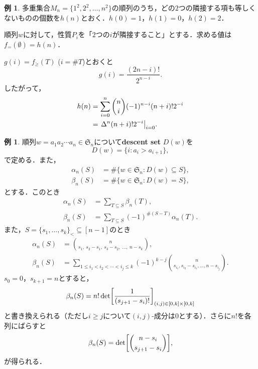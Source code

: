 \documentclass[xelatex,ja=standard,a4paper,14pt,everyparhook=compat]{bxjsarticle}
\newcommand{\fS}{\mathfrak{S}}
\theoremstyle{definition}
\newtheorem{example}[theorem]{例}
\begin{document}
\setcounter{theorem}{2}
\begin{example}
    多重集合$M_n = \{1^2, 2^2, \ldots, n^2\}$の順列のうち，どの$2$つの隣接する項も等しくないものの個数を$h(n)$とおく．$h(0) = 1$，$h(1) = 0$，$h(2) = 2$．

    順列$w$に対して，性質$P_i$を「$2$つの$i$が隣接すること」とする．求める値は$f_=(\emptyset) = h(n)$．

    $g(i) = f_\geq(T)$ ($i=\#T$)とおくと \begin{equation*}
        g(i) = \frac{(2n-i)!}{2^{n-i}}.
    \end{equation*}
    したがって， \begin{align*}
        h(n) &= \sum_{i=0}^n \binom{n}{i} (-1)^{n-i} (n+i)! 2^{-i} \\
        &= \mleft. \Delta^n (n+i)! 2^{-i} \mright|_{i=0}.
    \end{align*}
\end{example}

\begin{example}
    順列$w = a_1 a_2 \cdots a_n \in \fS_n$について\textbf{descent set} $D(w)$を \begin{equation*}
        D(w) = \{i : a_i > a_{i+1}\},
    \end{equation*}
    で定める．また， \begin{align*}
        \alpha_n(S) &= \#\{w \in \fS_n : D(w) \subseteq S\}, \\
        \beta_n(S) &= \#\{w \in \fS_n : D(w) = S\},
    \end{align*}
    とする．このとき \begin{align*}
        \alpha_n(S) &= \sum_{T \subseteq S} \beta_n(T), \\
        \beta_n(S) &= \sum_{T \subseteq S} (-1)^{\#(S-T)} \alpha_n(T).
    \end{align*}
    また，$S = \{s_1, \ldots, s_k\}_< \subseteq [n-1]$のとき \begin{align*}
        \alpha_n(S) &= \binom{n}{s_1,\: s_2-s_1,\: s_3-s_2,\: \ldots,\: n-s_k}, \\
        \beta_n(S) &= \sum_{1 \leq i_1 < i_2 < \cdots < i_j \leq k} (-1)^{k-j}
         \binom{n}{s_{i_1}, s_{i_2}-s_{i_1}, \ldots, n-s_{i_j}}.
    \end{align*}
    $s_0 = 0$，$s_{k+1} = n$とすると， \begin{equation*}
        \beta_n(S) = n! \det \mleft[ \frac{1}{(s_{j+1}-s_i)!} \mright]_{(i,j) \in [0,k] \times [0,k]}
    \end{equation*}
    と書き換えられる（ただし$i \geq j$について$(i,j)$-成分は$0$とする）．さらに$n!$を各列にばらすと \begin{equation*}
        \beta_n(S) = \det \mleft[ \binom{n-s_i}{s_{j+1}-s_i} \mright],
    \end{equation*}
    が得られる．
\end{example}
\end{document}
